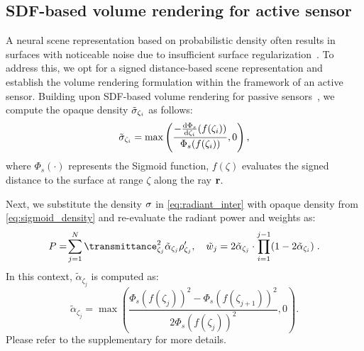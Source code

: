 \subsection{SDF-based volume rendering for active sensor} \label{sec:sdf_vol_render}
A neural scene representation based on probabilistic density often results in surfaces with noticeable noise due to insufficient surface regularization~\cite{wang2021neus}. To address this, we opt for a signed distance-based scene representation and establish the volume rendering formulation within the framework of an active sensor. Building upon SDF-based volume rendering for passive sensors~\cite{wang2021neus}, we compute the opaque density $\tilde{\sigma}_{\zeta_i}$ as follows:
\begin{equation}
\tilde{\sigma}_{\zeta_i} = \max\left(\frac{-\frac{{\textrm{d}}\Phi_s}{{\textrm{d}} \zeta_i}(f(\zeta_i))}{\Phi_s(f(\zeta_i))},0\right),
\label{eq:sigmoid_density}
\end{equation}
where $\Phi_s(\cdot)$ represents the Sigmoid function, $f(\zeta)$ evaluates the signed distance to the surface at range $\zeta$ along the ray $\mathbf{r}$. 

Next, we substitute the density $\sigma$ in \cref{eq:radiant_inter} with opaque density from \cref{eq:sigmoid_density} and re-evaluate the radiant power and weights as:
\begin{equation}
      P
      =\!\sum_{j=1}^N \transmittance^2_{\zeta_j} \tilde{\alpha}_{\zeta_j} \reflectance_{\zeta_j}',\quad \tilde{w}_j = 2 \tilde{\opacity}_{\zeta_j} \cdot\prod_{i=1}^{j-1}(1 - 2 \tilde{\opacity}_{\zeta_i})\;.
\end{equation}
In this context, $\tilde{\alpha}_{\zeta_j}$ is computed as:
\begin{equation}
    \tilde{\alpha}_{\zeta_j} = \max\left(\!\frac{{\Phi_s(f(\zeta_j))}^2 -{\Phi_s(f(\zeta_{j+1}))}^2}{{2\Phi_s(f(\zeta_j))}^2},0\right).
    \label{eq:new_weights}
\end{equation}
Please refer to the supplementary for more details.

   




